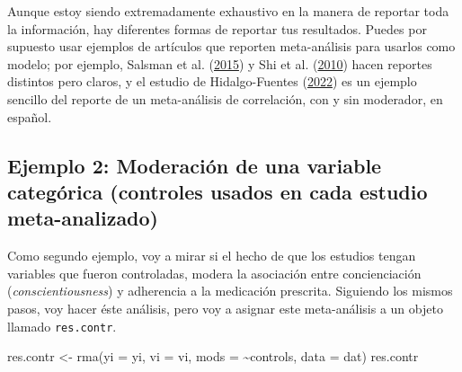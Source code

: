 \documentclass[
  bookmarksnumbered]{article}
\newenvironment{Shaded}{\begin{snugshade}}{\end{snugshade}}
\newcommand{\AttributeTok}[1]{\textcolor[rgb]{0.00,0.34,0.68}{#1}}
\newcommand{\FunctionTok}[1]{\textcolor[rgb]{0.39,0.29,0.61}{#1}}
\newcommand{\NormalTok}[1]{\textcolor[rgb]{0.12,0.11,0.11}{#1}}
\newcommand{\OtherTok}[1]{\textcolor[rgb]{0.00,0.43,0.16}{#1}}
\newcommand{\SpecialCharTok}[1]{\textcolor[rgb]{0.24,0.68,0.91}{#1}}
\begin{document}
Aunque estoy siendo extremadamente exhaustivo en la manera de reportar toda la información, hay diferentes formas de reportar tus resultados. Puedes por supuesto usar ejemplos de artículos que reporten meta-análisis para usarlos como modelo; por ejemplo, Salsman et al. (\protect\hyperlink{ref-salsmanMetaanalyticApproachExamining2015}{2015}) y Shi et al. (\protect\hyperlink{ref-shiCorrelationAdherenceRates2010}{2010}) hacen reportes distintos pero claros, y el estudio de Hidalgo-Fuentes (\protect\hyperlink{ref-hidalgo-fuentesUsoProblematicoInternet2022}{2022}) es un ejemplo sencillo del reporte de un meta-análisis de correlación, con y sin moderador, en español.

\hypertarget{ejemplo-2-moderaciuxf3n-de-una-variable-categuxf3rica-controles-usados-en-cada-estudio-meta-analizado}{%
\subsection{Ejemplo 2: Moderación de una variable categórica (controles usados en cada estudio meta-analizado)}\label{ejemplo-2-moderaciuxf3n-de-una-variable-categuxf3rica-controles-usados-en-cada-estudio-meta-analizado}}

Como segundo ejemplo, voy a mirar si el hecho de que los estudios tengan variables que fueron controladas, modera la asociación entre concienciación (\emph{conscientiousness}) y adherencia a la medicación prescrita. Siguiendo los mismos pasos, voy hacer éste análisis, pero voy a asignar este meta-análisis a un objeto llamado \texttt{res.contr}.

\begin{Shaded}
\begin{Highlighting}[]
\NormalTok{res.contr }\OtherTok{\textless{}{-}} \FunctionTok{rma}\NormalTok{(}\AttributeTok{yi =}\NormalTok{ yi, }\AttributeTok{vi =}\NormalTok{ vi, }\AttributeTok{mods =} \SpecialCharTok{\textasciitilde{}}\NormalTok{controls, }\AttributeTok{data =}\NormalTok{ dat)}
\NormalTok{res.contr}
\end{Highlighting}
\end{Shaded}
\end{document}
